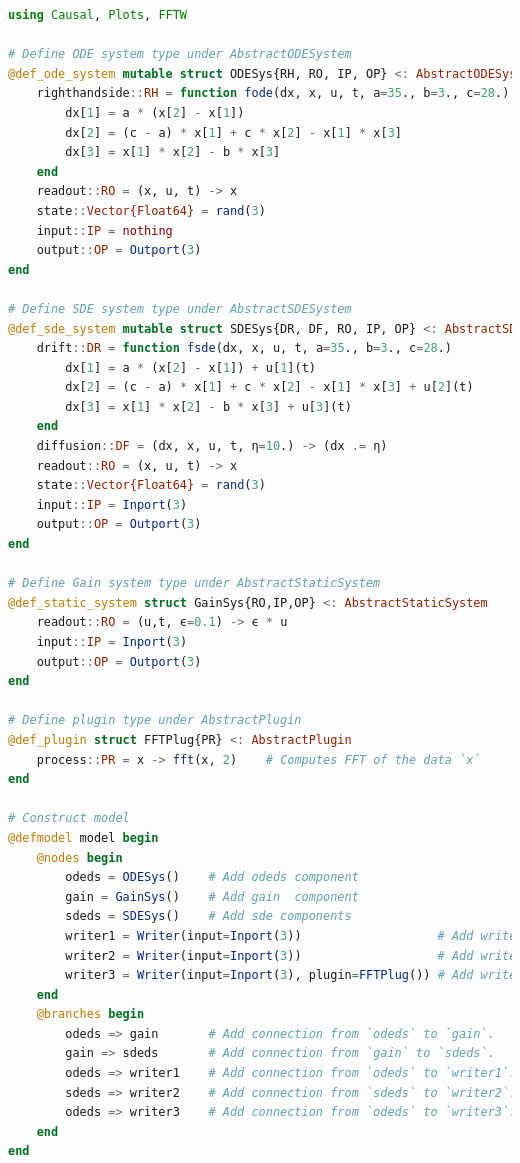 \documentclass{juliacon}
\begin{document}
\begin{lstlisting}[caption={Program using Causal.jl for the simulation of the system in Figure \ref{fig: coupled model}. Plots.jl is used to plot the simulation data while FFTW.jl is used to compute the FFT of the simulation data \cite{plots, fftw}.}, label={lst: coupled codes}, language=Julia]
using Causal, Plots, FFTW

# Define ODE system type under AbstractODESystem
@def_ode_system mutable struct ODESys{RH, RO, IP, OP} <: AbstractODESystem
    righthandside::RH = function fode(dx, x, u, t, a=35., b=3., c=28.)
        dx[1] = a * (x[2] - x[1])
        dx[2] = (c - a) * x[1] + c * x[2] - x[1] * x[3]
        dx[3] = x[1] * x[2] - b * x[3]
    end
    readout::RO = (x, u, t) -> x 
    state::Vector{Float64} = rand(3)
    input::IP = nothing
    output::OP = Outport(3)
end

# Define SDE system type under AbstractSDESystem
@def_sde_system mutable struct SDESys{DR, DF, RO, IP, OP} <: AbstractSDESystem
    drift::DR = function fsde(dx, x, u, t, a=35., b=3., c=28.)
        dx[1] = a * (x[2] - x[1]) + u[1](t)
        dx[2] = (c - a) * x[1] + c * x[2] - x[1] * x[3] + u[2](t)
        dx[3] = x[1] * x[2] - b * x[3] + u[3](t)
    end
    diffusion::DF = (dx, x, u, t, η=10.) -> (dx .= η) 
    readout::RO = (x, u, t) -> x
    state::Vector{Float64} = rand(3)
    input::IP = Inport(3)
    output::OP = Outport(3)
end

# Define Gain system type under AbstractStaticSystem
@def_static_system struct GainSys{RO,IP,OP} <: AbstractStaticSystem 
    readout::RO = (u,t, ϵ=0.1) -> ϵ * u 
    input::IP = Inport(3)
    output::OP = Outport(3)
end 

# Define plugin type under AbstractPlugin
@def_plugin struct FFTPlug{PR} <: AbstractPlugin 
    process::PR = x -> fft(x, 2)    # Computes FFT of the data `x`
end 

# Construct model
@defmodel model begin 
    @nodes begin 
        odeds = ODESys()    # Add odeds component  
        gain = GainSys()    # Add gain  component   
        sdeds = SDESys()    # Add sde components
        writer1 = Writer(input=Inport(3))                   # Add writer without plugin
        writer2 = Writer(input=Inport(3))                   # Add writer without plugin
        writer3 = Writer(input=Inport(3), plugin=FFTPlug()) # Add writer with `FFTPlug` plugin
    end
    @branches begin 
        odeds => gain       # Add connection from `odeds` to `gain`.
        gain => sdeds       # Add connection from `gain` to `sdeds`.
        odeds => writer1    # Add connection from `odeds` to `writer1`.
        sdeds => writer2    # Add connection from `sdeds` to `writer2`.
        odeds => writer3    # Add connection from `odeds` to `writer3`.
    end 
end 


\end{lstlisting}
\end{document}
